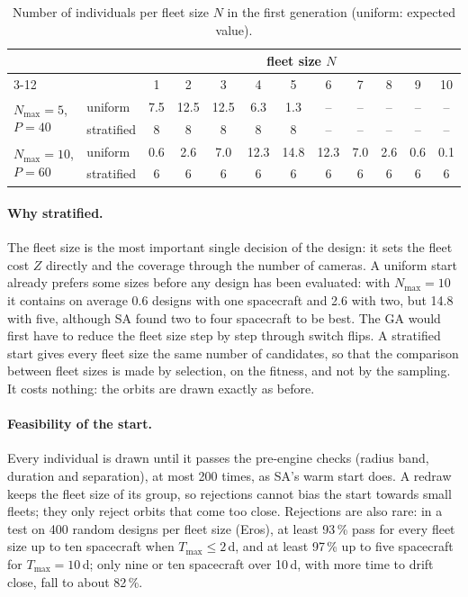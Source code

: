 \begin{table}[htbp]
\centering
\caption{Number of individuals per fleet size $N$ in the first generation (uniform: expected value).}
\label{tab:init}
\footnotesize
\begin{tabular}{@{}llcccccccccc@{}}
\toprule
 & & \multicolumn{10}{c}{fleet size $N$} \\
\cmidrule(l){3-12}
 & & 1 & 2 & 3 & 4 & 5 & 6 & 7 & 8 & 9 & 10 \\
\midrule
\multirow{2}{*}{$N_{\max}=5$, $P=40$}  & uniform    & 7.5 & 12.5 & 12.5 & 6.3 & 1.3 & -- & -- & -- & -- & -- \\
                                       & stratified & 8 & 8 & 8 & 8 & 8 & -- & -- & -- & -- & -- \\
\midrule
\multirow{2}{*}{$N_{\max}=10$, $P=60$} & uniform    & 0.6 & 2.6 & 7.0 & 12.3 & 14.8 & 12.3 & 7.0 & 2.6 & 0.6 & 0.1 \\
                                       & stratified & 6 & 6 & 6 & 6 & 6 & 6 & 6 & 6 & 6 & 6 \\
\bottomrule
\end{tabular}
\end{table}

\paragraph{Why stratified.} The fleet size is the most important single decision of the design:
it sets the fleet cost $Z$ directly and the coverage through the number of cameras. A uniform start
already prefers some sizes before any design has been evaluated: with $N_{\max}=10$ it contains on
average 0.6 designs with one spacecraft and 2.6 with two, but 14.8 with five, although \ac{SA} found
two to four spacecraft to be best. The \ac{GA} would first have to reduce the fleet size step by step
through switch flips. A stratified start gives every fleet size the same number of candidates, so
that the comparison between fleet sizes is made by selection, on the fitness, and not by the
sampling. It costs nothing: the orbits are drawn exactly as before.

\paragraph{Feasibility of the start.} Every individual is drawn until it passes the pre-engine
checks (radius band, duration and separation), at most 200 times, as \ac{SA}'s warm start does. A
redraw keeps the fleet size of its group, so rejections cannot bias the start towards small fleets;
they only reject orbits that come too close. Rejections are also rare: in a test on 400 random
designs per fleet size (Eros), at least 93\,\% pass for every fleet size up to ten spacecraft when
$T_{\max}\le2$\,d, and at least 97\,\% up to five spacecraft for $T_{\max}=10$\,d; only nine or ten
spacecraft over 10\,d, with more time to drift close, fall to about 82\,\%.

